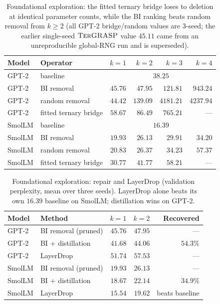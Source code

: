 \documentclass[10pt,a4paper]{article}
\newcommand{\term}{\textsc{TerGRASP}}
\begin{document}
\begin{table}[t]
\centering
\small
\begin{tabular}{llrrrr}
\toprule
Model & Operator & $k{=}1$ & $k{=}2$ & $k{=}3$ & $k{=}4$ \\
\midrule
GPT-2 & baseline & \multicolumn{4}{c}{$38.25$} \\
GPT-2 & BI removal & $45.76$ & $47.95$ & $121.81$ & $943.24$ \\
GPT-2 & random removal & $44.42$ & $139.09$ & $4181.21$ & $4237.94$ \\
GPT-2 & fitted ternary bridge & $58.67$ & $86.49$ & $765.21$ & --- \\
\midrule
SmolLM & baseline & \multicolumn{4}{c}{$16.39$} \\
SmolLM & BI removal & $19.93$ & $26.13$ & $29.91$ & $34.20$ \\
SmolLM & random removal & $20.83$ & $26.37$ & $34.23$ & $57.37$ \\
SmolLM & fitted ternary bridge & $30.77$ & $41.77$ & $58.21$ & --- \\
\bottomrule
\end{tabular}
\caption{Foundational exploration: the fitted ternary bridge loses to deletion
at identical parameter counts, while the BI ranking beats random removal from
$k\ge2$ (all GPT-2 bridge/random values are 3-seed; the earlier single-seed
$\term{}$ value $45.11$ came from an unreproducible global-RNG run and is
superseded).}
\label{tab:foundation}
\end{table}

\begin{table}[t]
\centering
\small
\begin{tabular}{llrrr}
\toprule
Model & Method & $k{=}1$ & $k{=}2$ & Recovered \\
\midrule
GPT-2 & BI removal (pruned) & $45.76$ & $47.95$ & --- \\
GPT-2 & BI $+$ distillation & $\mathbf{41.68}$ & $\mathbf{44.06}$ & $54.3\%$ \\
GPT-2 & LayerDrop & $51.74$ & $57.53$ & --- \\
\midrule
SmolLM & BI removal (pruned) & $19.93$ & $26.13$ & --- \\
SmolLM & BI $+$ distillation & $18.67$ & $22.14$ & $34.9\%$ \\
SmolLM & LayerDrop & $\mathbf{15.54}$ & $\mathbf{19.62}$ & beats baseline \\
\bottomrule
\end{tabular}
\caption{Foundational exploration: repair and LayerDrop (validation perplexity,
mean over three seeds). LayerDrop alone beats its own $16.39$ baseline on SmolLM;
distillation wins on GPT-2.}
\label{tab:foundation-repair}
\end{table}
\end{document}
